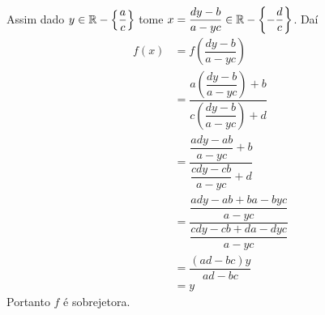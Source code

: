 \documentclass[12pt]{article}
\begin{document}
Assim dado $y \in  \mathbb{R} - \left\{\dfrac{a}{c}\right\}$ tome $x = \dfrac{dy - b}{a - yc} \in \mathbb{R} - \left\{-\dfrac{d}{c}\right\}$. Daí
\begin{align*}
	f(x) &= f\left(\dfrac{dy - b}{a - yc}\right) \\
	&= \dfrac{a\left(\dfrac{dy - b}{a - yc}\right) + b}{c\left(\dfrac{dy - b}{a - yc}\right) + d} \\
	&= \dfrac{\dfrac{ady - ab}{a - yc} + b}{\dfrac{cdy - cb}{a - yc} + d} \\
	&= \dfrac{\dfrac{ady - ab + ba - byc}{a - yc}}{\dfrac{cdy - cb + da - dyc}{a - yc}} \\
	&= \dfrac{(ad - bc)y}{ad - bc} \\ 
	&= y
\end{align*}
Portanto $f$ é sobrejetora.
\end{document}
